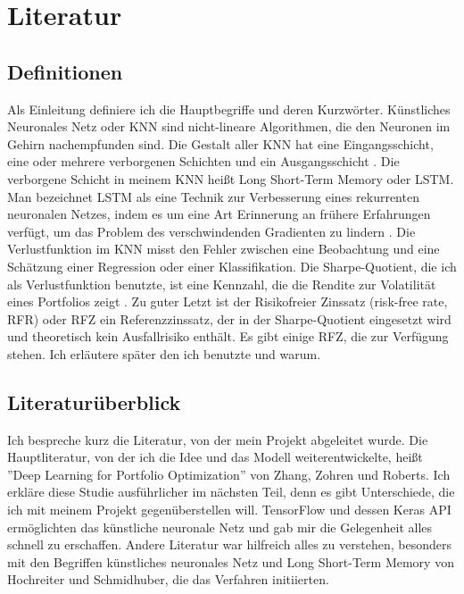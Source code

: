 \documentclass[12pt]{article}
\begin{document}
    \newpage \section{Literatur}

        \subsection{Definitionen}

            Als Einleitung definiere ich die Hauptbegriffe und deren Kurzwörter. 
            Künstliches Neuronales Netz oder KNN sind nicht-lineare Algorithmen, 
            die den Neuronen im Gehirn nachempfunden sind. 
            Die Gestalt aller KNN hat eine Eingangsschicht, 
            eine oder mehrere verborgenen Schichten und ein Ausgangsschicht \cite{bishop1995}. 
            Die verborgene Schicht in meinem KNN heißt Long Short-Term Memory oder
            LSTM. Man bezeichnet LSTM als eine Technik zur Verbesserung eines rekurrenten neuronalen Netzes,
            indem es um eine Art Erinnerung an frühere Erfahrungen verfügt, 
            um das Problem des verschwindenden Gradienten zu lindern \cite{hochreiter1997}. 
            Die Verlustfunktion im KNN misst den Fehler zwischen eine Beobachtung und eine Schätzung einer Regression oder einer Klassifikation. 
            Die Sharpe-Quotient, die ich als Verlustfunktion benutzte, 
            ist eine Kennzahl, die die Rendite zur Volatilität eines Portfolios zeigt \cite{sharpe1994}. 
            Zu guter Letzt ist der Risikofreier Zinssatz (risk-free rate, RFR) oder RFZ ein Referenzzinssatz,
            der in der Sharpe-Quotient eingesetzt wird und theoretisch kein Ausfallrisiko enthält. 
            Es gibt einige RFZ, die zur Verfügung stehen. Ich erläutere später den ich benutzte und warum.
        
        \subsection{Literaturüberblick}
        
            Ich bespreche kurz die Literatur, von der mein Projekt abgeleitet wurde. 
            Die Hauptliteratur, von der ich die Idee und das Modell weiterentwickelte, 
            heißt ''Deep Learning for Portfolio Optimization'' \cite{zhang2020} von Zhang, Zohren und Roberts. 
            Ich erkläre diese Studie ausführlicher im nächsten Teil, denn es gibt Unterschiede, 
            die ich mit meinem Projekt gegenüberstellen will. TensorFlow \cite{tensorflow2016} und 
            dessen Keras API \cite{chollet2015-keras} ermöglichten das künstliche neuronale Netz und 
            gab mir die Gelegenheit alles schnell zu erschaffen. 
            Andere Literatur war hilfreich alles zu verstehen, 
            besonders mit den Begriffen künstliches neuronales Netz \cite{bishop1995}
            und Long Short-Term Memory \cite{hochreiter1997} von Hochreiter und Schmidhuber, die das Verfahren initiierten.
\end{document}

